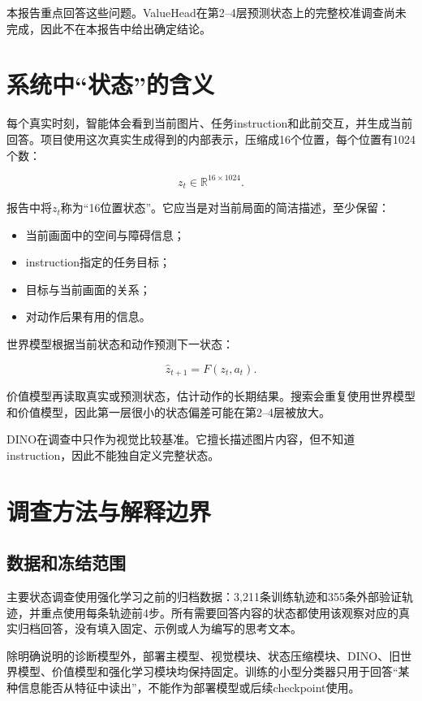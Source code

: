 \documentclass[UTF8,11pt,a4paper,fontset=none]{ctexart}
\newcommand{\R}{\mathbb{R}}
\begin{document}
本报告重点回答这些问题。ValueHead在第2--4层预测状态上的完整校准调查尚未完成，因此不在本报告中给出确定结论。

\section{系统中“状态”的含义}

每个真实时刻，智能体会看到当前图片、任务instruction和此前交互，并生成当前回答。项目使用这次真实生成得到的内部表示，压缩成16个位置，每个位置有1024个数：

\begin{equation}
  z_t \in \R^{16\times 1024}.
\end{equation}

报告中将$z_t$称为“16位置状态”。它应当是对当前局面的简洁描述，至少保留：

\begin{itemize}
  \item 当前画面中的空间与障碍信息；
  \item instruction指定的任务目标；
  \item 目标与当前画面的关系；
  \item 对动作后果有用的信息。
\end{itemize}

世界模型根据当前状态和动作预测下一状态：

\begin{equation}
  \hat z_{t+1}=F(z_t,a_t).
\end{equation}

价值模型再读取真实或预测状态，估计动作的长期结果。搜索会重复使用世界模型和价值模型，因此第一层很小的状态偏差可能在第2--4层被放大。

DINO在调查中只作为视觉比较基准。它擅长描述图片内容，但不知道instruction，因此不能独自定义完整状态。

\section{调查方法与解释边界}

\subsection{数据和冻结范围}

主要状态调查使用强化学习之前的归档数据：3,211条训练轨迹和355条外部验证轨迹，并重点使用每条轨迹前4步。所有需要回答内容的状态都使用该观察对应的真实归档回答，没有填入固定、示例或人为编写的思考文本。

除明确说明的诊断模型外，部署主模型、视觉模块、状态压缩模块、DINO、旧世界模型、价值模型和强化学习模块均保持固定。训练的小型分类器只用于回答“某种信息能否从特征中读出”，不能作为部署模型或后续checkpoint使用。
\end{document}
